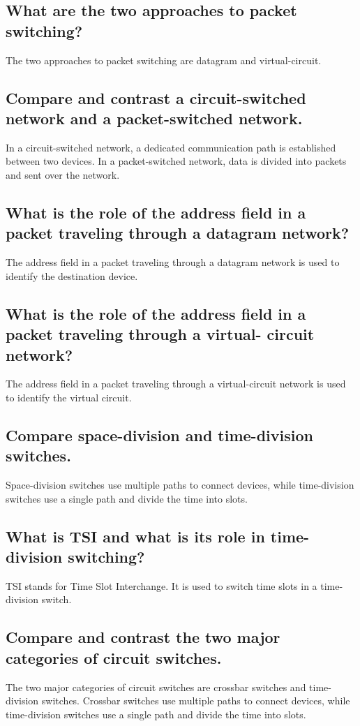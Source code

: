 \documentclass{article}
\begin{document}
\subsection{
	What are the two approaches to packet switching?
}
The two approaches to packet switching are datagram and virtual-circuit.
\subsection{
	Compare and contrast a circuit-switched network and a packet-switched network.
}
In a circuit-switched network, a dedicated communication path is established between two devices. 
In a packet-switched network, data is divided into packets and sent over the network.
\subsection{
	What is the role of the address field in a packet traveling through a datagram
	network?
}
The address field in a packet traveling through a datagram network is used to identify the destination device.
\subsection{
	What is the role of the address field in a packet traveling through a virtual-
	circuit network?
}
The address field in a packet traveling through a virtual-circuit network is used to identify the virtual circuit.
\subsection{
	Compare space-division and time-division switches.
}
Space-division switches use multiple paths to connect devices, while time-division switches use a single path and divide the time into slots.
\subsection{
	What is TSI and what is its role in time-division switching?
}
TSI stands for Time Slot Interchange. It is used to switch time slots in a time-division switch.
\subsection{
	Compare and contrast the two major categories of circuit switches.
}
The two major categories of circuit switches are crossbar switches and time-division switches. 
Crossbar switches use multiple paths to connect devices, while time-division switches use a single path and divide the time into slots.
\end{document}
